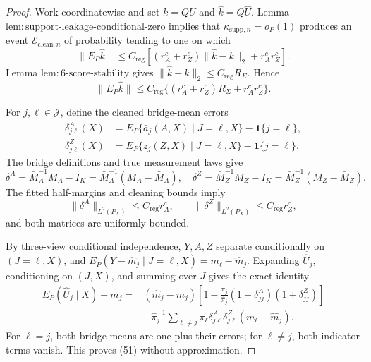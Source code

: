 \documentclass{article}
\begin{document}
\begin{proof}
Work coordinatewise and set \(k=QU\) and \(\widehat k=\widehat Q\widehat U\).  Lemma \(\mathrm{lem{:}support\mbox{-}leakage\mbox{-}conditional\mbox{-}zero}\) implies that \(\kappa_{\mathrm{supp},n}=o_P(1)\) produces an event \(\mathcal E_{\mathrm{clean},n}\) of probability tending to one on which
\[
 \|E_P\widehat k\|
 \leq C_{\mathrm{reg}}
 \left[(r_A^c+r_Z^c)\|\widehat k-k\|_2+r_A^cr_Z^c\right]. \tag{46}
\]
Lemma \(\mathrm{lem{:}6\mbox{-}score\mbox{-}stability}\) gives
\(\|\widehat k-k\|_2\leq C_{\mathrm{reg}}R_\Sigma\).  Hence
\[
 \|E_P\widehat k\|
 \leq C_{\mathrm{reg}}\{(r_A^c+r_Z^c)R_\Sigma+r_A^cr_Z^c\}. \tag{47}
\]

For \(j,\ell\in\mathcal J\), define the cleaned bridge-mean errors
\[
\begin{aligned}
 \delta^A_{j\ell}(X)
 &=E_P\{\bar a_j(A,X)\mid J=\ell,X\}-\mathbf 1\{j=\ell\},\\
 \delta^Z_{j\ell}(X)
 &=E_P\{\bar z_j(Z,X)\mid J=\ell,X\}-\mathbf 1\{j=\ell\}.
\end{aligned} \tag{48}
\]
The bridge definitions and true measurement laws give
\[
 \delta^A=\bar M_A^{-1}M_A-I_K=\bar M_A^{-1}(M_A-\bar M_A),
 \quad
 \delta^Z=\bar M_Z^{-1}M_Z-I_K=\bar M_Z^{-1}(M_Z-\bar M_Z). \tag{49}
\]
The fitted half-margins and cleaning bounds imply
\[
 \|\delta^A\|_{L^2(P_X)}\leq C_{\mathrm{reg}}r_A^c,\qquad
 \|\delta^Z\|_{L^2(P_X)}\leq C_{\mathrm{reg}}r_Z^c, \tag{50}
\]
and both matrices are uniformly bounded.

By three-view conditional independence, \(Y,A,Z\) separate conditionally on \((J=\ell,X)\), and
\(E_P(Y-\widehat m_j\mid J=\ell,X)=m_\ell-\widehat m_j\).  Expanding \(\widehat U_j\), conditioning on \((J,X)\), and summing over \(J\) gives the exact identity
\[
\begin{aligned}
 E_P(\widehat U_j\mid X)-m_j
={}&(\widehat m_j-m_j)
 \left[1-\frac{\pi_j}{\widehat\pi_j}
 (1+\delta^A_{jj})(1+\delta^Z_{jj})\right]\\
&+\widehat\pi_j^{-1}\sum_{\ell\ne j}\pi_\ell
 \delta^A_{j\ell}\delta^Z_{j\ell}(m_\ell-\widehat m_j). \tag{51}
\end{aligned}
\]
For \(\ell=j\), both bridge means are one plus their errors; for \(\ell\ne j\), both indicator terms vanish.  This proves (51) without approximation.


\end{proof}
\end{document}
